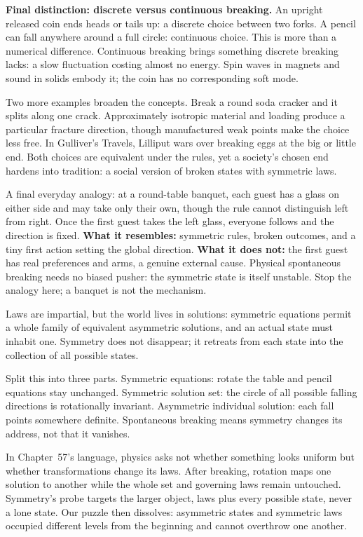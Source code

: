 \begin{mainline}
\textbf{Final distinction: discrete versus continuous breaking.} An upright released coin ends heads or tails up: a discrete choice between two forks. A pencil can fall anywhere around a full circle: continuous choice. This is more than a numerical difference. Continuous breaking brings something discrete breaking lacks: a slow fluctuation costing almost no energy. Spin waves in magnets and sound in solids embody it; the coin has no corresponding soft mode.

Two more examples broaden the concepts. Break a round soda cracker and it splits along one crack. Approximately isotropic material and loading produce a particular fracture direction, though manufactured weak points make the choice less free. In Gulliver's Travels, Lilliput wars over breaking eggs at the big or little end. Both choices are equivalent under the rules, yet a society's chosen end hardens into tradition: a social version of broken states with symmetric laws.

A final everyday analogy: at a round-table banquet, each guest has a glass on either side and may take only their own, though the rule cannot distinguish left from right. Once the first guest takes the left glass, everyone follows and the direction is fixed. \textbf{What it resembles:} symmetric rules, broken outcomes, and a tiny first action setting the global direction. \textbf{What it does not:} the first guest has real preferences and arms, a genuine external cause. Physical spontaneous breaking needs no biased pusher: the symmetric state is itself unstable. Stop the analogy here; a banquet is not the mechanism.
\end{mainline}


\begin{oneline}
Laws are impartial, but the world lives in solutions: symmetric equations permit a whole family of equivalent asymmetric solutions, and an actual state must inhabit one. Symmetry does not disappear; it retreats from each state into the collection of all possible states.
\end{oneline}

\begin{mainline}
Split this into three parts. Symmetric equations: rotate the table and pencil equations stay unchanged. Symmetric solution set: the circle of all possible falling directions is rotationally invariant. Asymmetric individual solution: each fall points somewhere definite. Spontaneous breaking means symmetry changes its address, not that it vanishes.

In Chapter~57's language, physics asks not whether something looks uniform but whether transformations change its laws. After breaking, rotation maps one solution to another while the whole set and governing laws remain untouched. Symmetry's probe targets the larger object, laws plus every possible state, never a lone state. Our puzzle then dissolves: asymmetric states and symmetric laws occupied different levels from the beginning and cannot overthrow one another.
\end{mainline}

